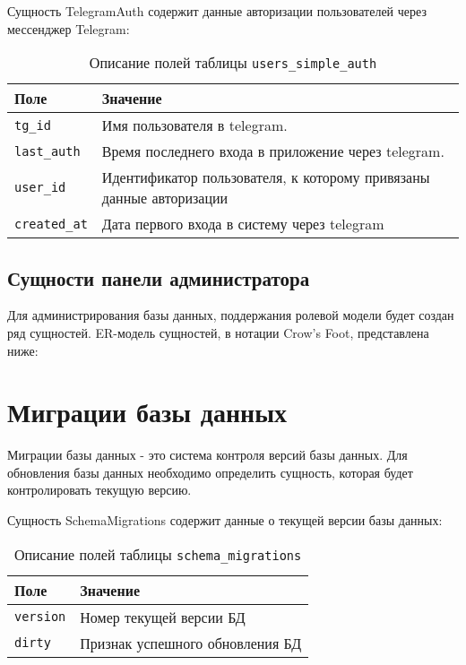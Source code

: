 Сущность TelegramAuth содержит данные авторизации пользователей через мессенджер Telegram:
\begin{table}[!ht]
    \caption{Описание полей таблицы \texttt{users\_simple\_auth}}
    \label{tbl:telegram_auth}
    \begin{center}
        \begin{tabular}{|p{}p{}|}
            \hline
            \textbf{Поле} & \textbf{Значение} \\\hline
            \texttt{tg\_id} & Имя пользователя в telegram. \\\hline
            \texttt{last\_auth} & Время последнего входа в приложение через telegram. \\\hline
            \texttt{user\_id} & Идентификатор пользователя, к которому привязаны данные авторизации \\\hline
            \texttt{created\_at} & Дата первого входа в систему через telegram \\\hline
        \end{tabular}
    \end{center}
\end{table}
\newpage
\subsection{Сущности панели администратора}
Для администрирования базы данных, поддержания ролевой модели будет создан ряд сущностей.
ER-модель сущностей, в нотации Crow’s Foot, представлена ниже:

\section{Миграции базы данных}
Миграции базы данных - это система контроля версий базы данных.
Для обновления базы данных необходимо определить сущность, которая будет контролировать текущую версию.

Сущность SchemaMigrations содержит данные о текущей версии базы данных:
\begin{table}[!ht]
    \caption{Описание полей таблицы \texttt{schema\_migrations}}
    \label{tbl:schema_migrations}
    \begin{center}
        \begin{tabular}{|p{}p{}|}
            \hline
            \textbf{Поле} & \textbf{Значение} \\\hline
            \texttt{version} & Номер текущей версии БД \\\hline
            \texttt{dirty} & Признак успешного обновления БД \\\hline
        \end{tabular}
    \end{center}
\end{table}

